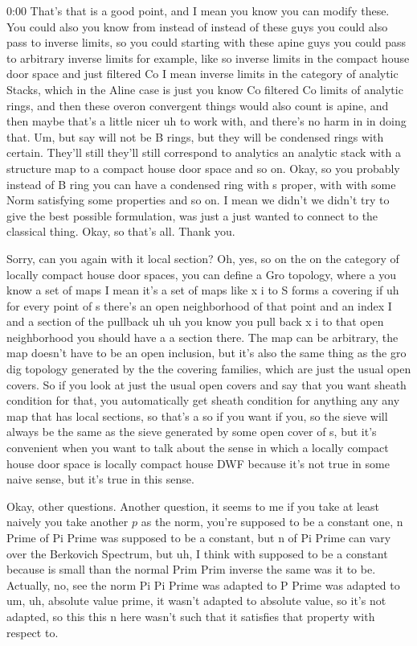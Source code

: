 \begin{unfinished}{0:00}
That's that is a good point, and I mean you know you can modify these. You could also you know from instead of instead of these guys you could also pass to inverse limits, so you could starting with these apine guys you could pass to arbitrary inverse limits for example, like so inverse limits in the compact house door space and just filtered Co I mean inverse limits in the category of analytic Stacks, which in the Aline case is just you know Co filtered Co limits of analytic rings, and then these overon convergent things would also count is apine, and then maybe that's a little nicer uh to work with, and there's no harm in in doing that. Um, but say will not be B rings, but they will be condensed rings with certain. They'll still they'll still correspond to analytics an analytic stack with a structure map to a compact house door space and so on. Okay, so you probably instead of B ring you can have a condensed ring with s proper, with with some Norm satisfying some properties and so on. I mean we didn't we didn't try to give the best possible formulation, was just a just wanted to connect to the classical thing. Okay, so that's all. Thank you.

Sorry, can you again with it local section? Oh, yes, so on the on the category of locally compact house door spaces, you can define a Gro topology, where a you know a set of maps I mean it's a set of maps like x i to S forms a covering if uh for every point of s there's an open neighborhood of that point and an index I and a section of the pullback uh uh you know you pull back x i to that open neighborhood you should have a a section there. The map can be arbitrary, the map doesn't have to be an open inclusion, but it's also the same thing as the gro dig topology generated by the the covering families, which are just the usual open covers. So if you look at just the usual open covers and say that you want sheath condition for that, you automatically get sheath condition for anything any any map that has local sections, so that's a so if you want if you, so the sieve will always be the same as the sieve generated by some open cover of s, but it's convenient when you want to talk about the sense in which a locally compact house door space is locally compact house DWF because it's not true in some naive sense, but it's true in this sense.

Okay, other questions. Another question, it seems to me if you take at least naively you take another $p$ as the norm, you're supposed to be a constant one, n Prime of Pi Prime was supposed to be a constant, but n of Pi Prime can vary over the Berkovich Spectrum, but uh, I think with supposed to be a constant because is small than the normal Prim Prim inverse the same was it to be. Actually, no, see the norm Pi Pi Prime was adapted to P Prime was adapted to um, uh, absolute value prime, it wasn't adapted to absolute value, so it's not adapted, so this this n here wasn't such that it satisfies that property with respect to.


\end{unfinished}
